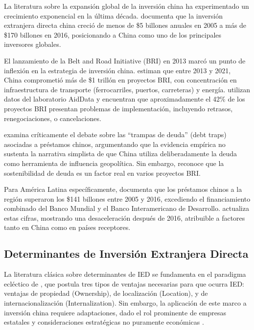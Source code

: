 \documentclass[12pt]{article}
\begin{document}
La literatura sobre la expansión global de la inversión china ha experimentado un crecimiento exponencial en la última década. \citet{scissors2020china} documenta que la inversión extranjera directa china creció de menos de \$5 billones anuales en 2005 a más de \$170 billones en 2016, posicionando a China como uno de los principales inversores globales. 

El lanzamiento de la Belt and Road Initiative (BRI) en 2013 marcó un punto de inflexión en la estrategia de inversión china. \citet{hurley2019examining} estiman que entre 2013 y 2021, China comprometió más de \$1 trillón en proyectos BRI, con concentración en infraestructura de transporte (ferrocarriles, puertos, carreteras) y energía. \citet{horn2021china} utilizan datos del laboratorio AidData y encuentran que aproximadamente el 42\% de los proyectos BRI presentan problemas de implementación, incluyendo retrasos, renegociaciones, o cancelaciones.

\citet{brautigam2020debt} examina críticamente el debate sobre las ``trampas de deuda'' (debt traps) asociadas a préstamos chinos, argumentando que la evidencia empírica no sustenta la narrativa simplista de que China utiliza deliberadamente la deuda como herramienta de influencia geopolítica. Sin embargo, reconoce que la sostenibilidad de deuda es un factor real en varios proyectos BRI.

Para América Latina específicamente, \citet{gallagher2016china} documenta que los préstamos chinos a la región superaron los \$141 billones entre 2005 y 2016, excediendo el financiamiento combinado del Banco Mundial y el Banco Interamericano de Desarrollo. \citet{ray2020china} actualiza estas cifras, mostrando una desaceleración después de 2016, atribuible a factores tanto en China como en países receptores.

\subsection{Determinantes de Inversión Extranjera Directa}

La literatura clásica sobre determinantes de IED se fundamenta en el paradigma ecléctico de \citet{dunning1988eclectic}, que postula tres tipos de ventajas necesarias para que ocurra IED: ventajas de propiedad (Ownership), de localización (Location), y de internacionalización (Internalization). Sin embargo, la aplicación de este marco a inversión china requiere adaptaciones, dado el rol prominente de empresas estatales y consideraciones estratégicas no puramente económicas \citep{kolstad2012determinants}.
\end{document}
